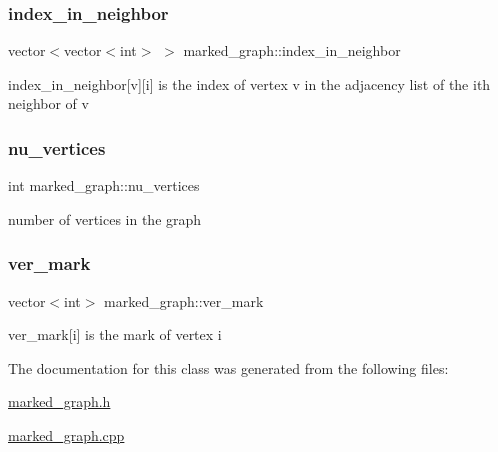 \subsubsection{\texorpdfstring{index\+\_\+in\+\_\+neighbor}{index\_in\_neighbor}}
{\footnotesize\ttfamily vector$<$vector$<$int$>$ $>$ marked\+\_\+graph\+::index\+\_\+in\+\_\+neighbor}



index\+\_\+in\+\_\+neighbor\mbox{[}v\mbox{]}\mbox{[}i\mbox{]} is the index of vertex v in the adjacency list of the ith neighbor of v 

\mbox{\label{classmarked__graph_acf79c6aeb8f32614cb14a5baaa6c9f9b}} 
\subsubsection{\texorpdfstring{nu\+\_\+vertices}{nu\_vertices}}
{\footnotesize\ttfamily int marked\+\_\+graph\+::nu\+\_\+vertices}



number of vertices in the graph 

\mbox{\label{classmarked__graph_ac83e9377dd4d8bb95be1ac949b127296}} 
\subsubsection{\texorpdfstring{ver\+\_\+mark}{ver\_mark}}
{\footnotesize\ttfamily vector$<$int$>$ marked\+\_\+graph\+::ver\+\_\+mark}



ver\+\_\+mark\mbox{[}i\mbox{]} is the mark of vertex i 



The documentation for this class was generated from the following files\+:\begin{DoxyCompactItemize}
\item 
\hyperlink{marked__graph_8h}{marked\+\_\+graph.\+h}\item 
\hyperlink{marked__graph_8cpp}{marked\+\_\+graph.\+cpp}\end{DoxyCompactItemize}
